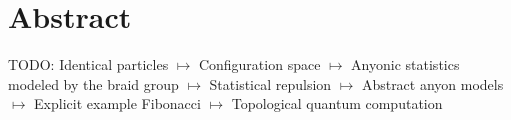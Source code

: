 \chapter*{Abstract}

TODO: Identical particles $↦$ Configuration space $↦$ Anyonic statistics modeled by the braid group $↦$ Statistical repulsion $↦$ Abstract anyon models $↦$ Explicit example Fibonacci $↦$ Topological quantum computation
